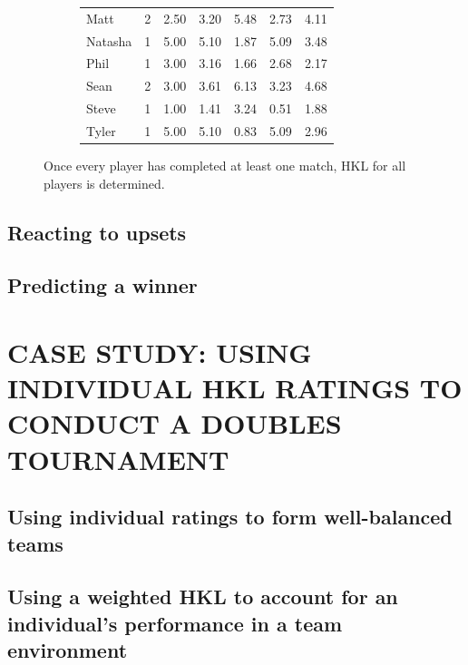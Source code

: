 \documentclass[letterpaper, 10 pt, conference]{ieeeconf}  %
\begin{document}
\begin{figure}[hb]
\begin{subfigure}[h]{0.4\textwidth}
\begin{tabular}{lccc|ccc}
                        Matt	& 2	& 2.50  & 3.20 & 5.48 & 2.73 & 4.11 \\
                        Natasha	& 1	& 5.00  & 5.10 & 1.87 & 5.09 & 3.48 \\
                        Phil	& 1	& 3.00	& 3.16 & 1.66 & 2.68 & 2.17 \\
                        Sean	& 2	& 3.00	& 3.61 & 6.13 & 3.23 & 4.68 \\
                        Steve	& 1	& 1.00 	& 1.41 & 3.24 & 0.51 & 1.88 \\
                        Tyler	& 1	& 5.00  & 5.10 & 0.83 & 5.09 & 2.96 \\
                        \bottomrule
                \end{tabular}
        \end{subfigure}
        \caption{Once every player has completed at least one match, HKL for all 
                 players is determined.}
\end{figure}

\subsection{Reacting to upsets}

\subsection{Predicting a winner}

\section{CASE STUDY: USING INDIVIDUAL HKL RATINGS TO CONDUCT A DOUBLES TOURNAMENT}

\subsection{Using individual ratings to form well-balanced teams}
\subsection{Using a weighted HKL to account for an individual's performance in a team environment} 
\end{document}
